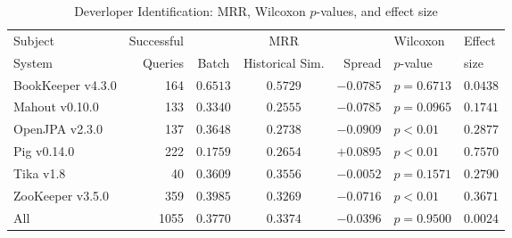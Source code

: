 \begin{table}[t]
\centering
\caption{Deverloper Identification: MRR, Wilcoxon $p$-values, and effect size}
\begin{tabular}{l|r|ccr|ll}
\toprule
Subject & Successful &    & MRR &        & Wilcoxon  & Effect \\
System  & Queries    & Batch & Historical Sim.  & Spread & $p$-value & size \\
\midrule
BookKeeper v4.3.0 & 164 & $\bm{0.6513}$ & $0.5729$ & $-0.0785$ & $p = 0.6713$ & $0.0438$ \\
Mahout v0.10.0 & 133 & $\bm{0.3340}$ & $0.2555$ & $-0.0785$ & $p = 0.0965$ & $0.1741$ \\
OpenJPA v2.3.0 & 137 & $\bm{0.3648}$ & $0.2738$ & $-0.0909$ & $p < 0.01$ & $0.2877$ \\
Pig v0.14.0 & 222 & $0.1759$ & $\bm{0.2654}$ & $+0.0895$ & $p < 0.01$ & $0.7570$ \\
Tika v1.8 & 40 & $\bm{0.3609}$ & $0.3556$ & $-0.0052$ & $p = 0.1571$ & $0.2790$ \\
ZooKeeper v3.5.0 & 359 & $\bm{0.3985}$ & $0.3269$ & $-0.0716$ & $p < 0.01$ & $0.3671$ \\
\midrule
All & 1055 & $\bm{0.3770}$ & $0.3374$ & $-0.0396$ & $p = 0.9500$ & $0.0024$ \\
\bottomrule
\end{tabular}
\label{table:triage_rq2}
\end{table}
